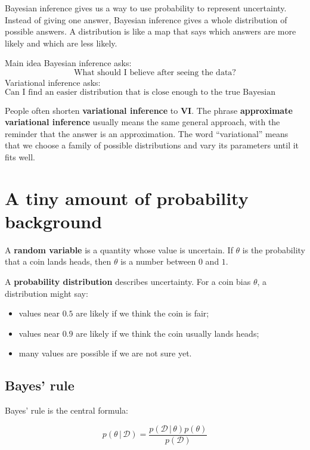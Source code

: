 \documentclass[11pt]{article}
\newcommand{\data}{\mathcal{D}}
\newcommand{\given}{\,|\,}
\begin{document}
Bayesian inference gives us a way to use probability to represent uncertainty.
Instead of giving one answer, Bayesian inference gives a whole distribution of possible answers.
A distribution is like a map that says which answers are more likely and which are less likely.

\begin{idea}{Main idea}
Bayesian inference asks: 
\[
\text{What should I believe after seeing the data?}
\]
Variational inference asks:
\[
\text{Can I find an easier distribution that is close enough to the true Bayesian answer?}
\]
\end{idea}

People often shorten \textbf{variational inference} to \textbf{VI}. The phrase \textbf{approximate variational inference} usually means the same general approach, with the reminder that the answer is an approximation.
The word ``variational'' means that we choose a family of possible distributions and vary its parameters until it fits well.

\section{A tiny amount of probability background}

A \textbf{random variable} is a quantity whose value is uncertain. If $\theta$ is the probability that a coin lands heads, then $\theta$ is a number between $0$ and $1$.

A \textbf{probability distribution} describes uncertainty. For a coin bias $\theta$, a distribution might say:

\begin{itemize}[leftmargin=*]
  \item values near $0.5$ are likely if we think the coin is fair;
  \item values near $0.9$ are likely if we think the coin usually lands heads;
  \item many values are possible if we are not sure yet.
\end{itemize}

\subsection{Bayes' rule}

Bayes' rule is the central formula:

\begin{equation}
\boxed{
  p(\theta \given \data)
  = \frac{p(\data \given \theta)p(\theta)}{p(\data)}
}
\end{equation}
\end{document}
